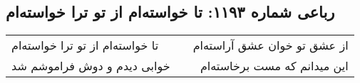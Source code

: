\begin{center}
\section*{رباعی شماره ۱۱۹۳: تا خواسته‌ام از تو ترا خواسته‌ام}
\label{sec:1193}
\begin{longtable}{l p{0.5cm} r}
تا خواسته‌ام از تو ترا خواسته‌ام
&&
از عشق تو خوان عشق آراسته‌ام
\\
خوابی دیدم و دوش فراموشم شد
&&
این میدانم که مست برخاسته‌ام
\\
\end{longtable}
\end{center}
